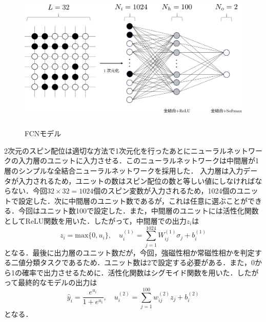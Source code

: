 \documentclass[a4paper,11pt]{jsreport}
\begin{document}
\begin{figure}[H]
  \begin{center}
    \includegraphics[height=7cm]{image/相分類FCNモデル.png}
    \caption{FCNモデル}
    \label{相分類FCNモデル}
  \end{center}
\end{figure}

2次元のスピン配位は適切な方法で1次元化を行ったあとにニューラルネットワークの入力層のユニットに入力させる．このニューラルネットワークは中間層が1層のシンプルな全結合ニューラルネットワークを採用した．
入力層は入力データが入力されるため，ユニットの数はスピン配位の数と等しい値にしなければならない．今回$32 \times 32 = 1024$個のスピン変数が入力されるため，1024個のユニットで設定した．次に中間層のユニット数であるが，これは任意に選ぶことができる．今回はユニット数100で設定した．また，中間層のユニットには活性化関数としてReLU関数を用いた．したがって，中間層での出力$z_i$は
\begin{equation}
  z_i 
  = \mathrm{max}\{0,u_i\}, \quad
  u_i^{(1)} = \sum_{j=1}^{1024} W_{ij}^{(1)} \sigma_j + b_i^{(1)}
\end{equation}
となる．最後に出力層のユニット数だが，今回，強磁性相か常磁性相かを判定する二値分類タスクであるため．ユニット数は2で設定する必要がある．また，0から1の確率で出力させるために．活性化関数はシグモイド関数を用いた．したがって最終的なモデルの出力は
\begin{equation}
  \hat{y}_i 
  = \frac{e^{u_i}}{1 + e^{u_i}}, \quad
  u_i^{(2)} = \sum_{j=1}^{100} w_{ij}^{(2)} z_j + b_i^{(2)}
\end{equation}
となる．
\end{document}
